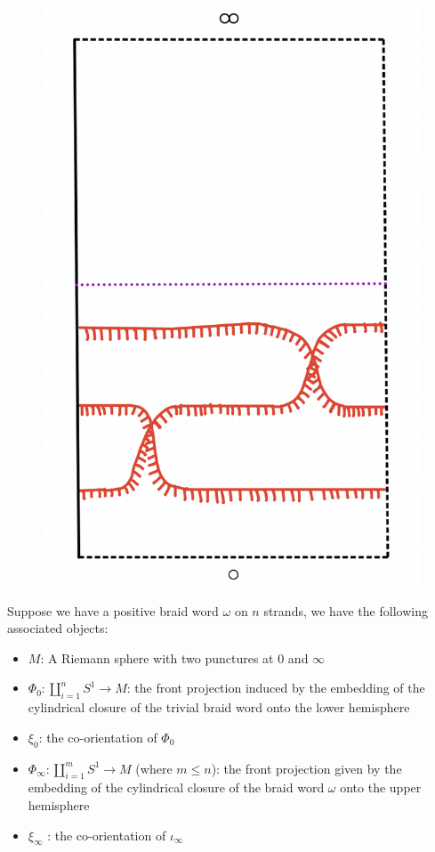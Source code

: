 \begin{figure}[H] 
    \centering
    \includegraphics[scale = 0.95]{diagrams/natural_alternating_diagrams/4-2.png} 
    \caption{}
    \label{fig:your-label}
\end{figure}

Suppose we have a positive braid word $\omega$ on $n$ strands, we have the following associated objects: 
\begin{itemize}
\item $M$: A Riemann sphere with two punctures at $0$ and $\infty$

\item $\Phi_0 : \coprod_{i=1}^{n} S^1 \rightarrow  M$: the front projection induced by the embedding of the cylindrical closure of the trivial braid word onto the lower hemisphere

\item $\xi_0$: the co-orientation of $\Phi_0$

\item $\Phi_\infty : \coprod_{i=1}^{m} S^1 \rightarrow M$ (where $m \leq n$): the front projection given by the embedding of the cylindrical closure of the braid word $\omega$ onto the upper hemisphere

\item $\xi_\infty$ : the co-orientation of $\iota_\infty$
\end{itemize}

